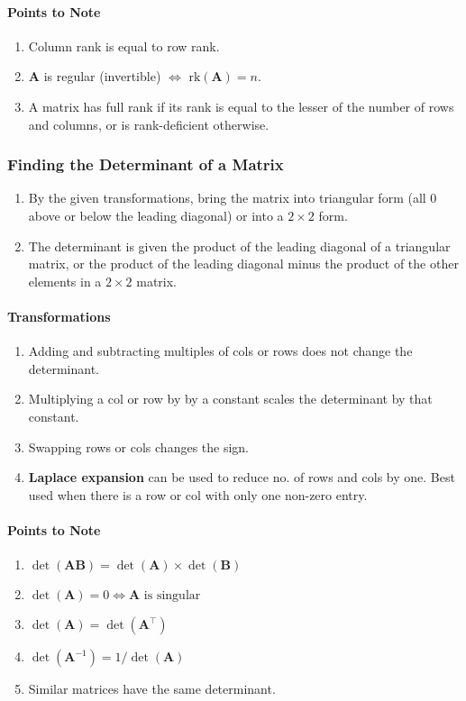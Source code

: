 \documentclass[10pt,twoside,twocolumn]{article}
\begin{document}
\paragraph{Points to Note}
\begin{enumerate}
\item Column rank is equal to row rank. 
\item $\mathbf{A}$ is regular (invertible) $\iff$ $\mbox{rk}\left(\mathbf{A}\right)=n$. 
\item A matrix has full rank if its rank is equal to the lesser of the number
of rows and columns, or is rank-deficient otherwise. 
\end{enumerate}

\subsubsection{Finding the Determinant of a Matrix}
\begin{enumerate}
\item By the given transformations, bring the matrix into triangular form
(all 0 above or below the leading diagonal) or into a $2\times2$
form. 
\item The determinant is given the product of the leading diagonal of a
triangular matrix, or the product of the leading diagonal minus the
product of the other elements in a $2\times2$ matrix. 
\end{enumerate}

\paragraph{Transformations}
\begin{enumerate}
\item Adding and subtracting multiples of cols or rows does not change the
determinant. 
\item Multiplying a col or row by by a constant scales the determinant by
that constant. 
\item Swapping rows or cols changes the sign. 
\item \textbf{Laplace expansion} can be used to reduce no. of rows and cols
by one. Best used when there is a row or col with only one non-zero
entry. 
\end{enumerate}

\paragraph{Points to Note}
\begin{enumerate}
\item $\det\left(\mathbf{A}\mathbf{B}\right)=\det\left(\mathbf{A}\right)\times\det\left(\mathbf{B}\right)$ 
\item $\det\left(\mathbf{A}\right)=0\iff\mathbf{A}\mbox{ is singular}$ 
\item $\det\left(\mathbf{A}\right)=\det\left(\mathbf{A}^{\top}\right)$ 
\item $\det\left(\mathbf{A}^{-1}\right)=1/\det\left(\mathbf{A}\right)$ 
\item Similar matrices have the same determinant. 
\end{enumerate}
\end{document}
